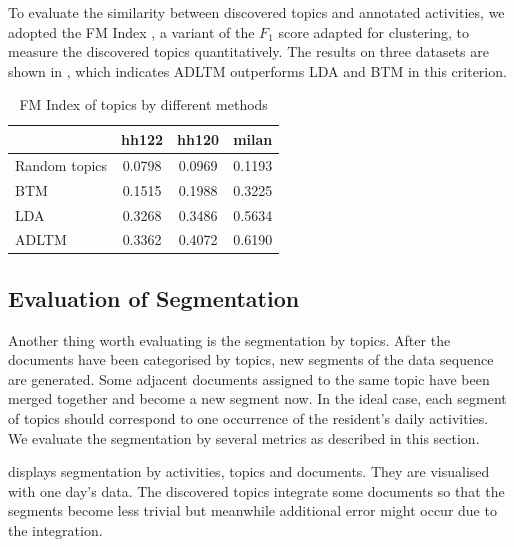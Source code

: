 \documentclass{article}
\begin{document}
To evaluate the similarity between discovered topics and annotated activities, we adopted the \ac{FM} Index \cite{fowlkes1983method,Ramirez2012125}, a variant of the $F_1$ score adapted for clustering, to measure the discovered topics quantitatively. The results on three datasets are shown in , which indicates \ac{ADLTM} outperforms \ac{LDA} \cite{blei2003latent} and \ac{BTM} \cite{wallach2006topic} in this criterion.

{%
\begin{table}[!t]
\centering
\scriptsize
\begin{tabular}{lccc}
\toprule
              & hh122  & hh120  & milan \\
\midrule
Random topics & 0.0798 & 0.0969 & 0.1193 \\
\ac{BTM}      & 0.1515 & 0.1988 & 0.3225 \\
\ac{LDA}      & 0.3268 & 0.3486 & 0.5634 \\
\ac{ADLTM}    & 0.3362 & 0.4072 & 0.6190 \\
\bottomrule
\end{tabular}
\caption{\ac{FM} Index of topics by different methods}
\label{tab:fmidx}
\end{table}
}


\subsection{Evaluation of Segmentation}
Another thing worth evaluating is the segmentation by topics. After the documents have been categorised by topics, new segments of the data sequence are generated. Some adjacent documents assigned to the same topic have been merged together and become a new segment now.  In the ideal case, each segment of topics should correspond to one occurrence of the resident's daily activities. We evaluate the segmentation by several metrics as described in this section.

 displays segmentation by activities, topics and documents. They are visualised with one day's data. The discovered topics integrate some documents so that the segments become less trivial but meanwhile additional error might occur due to the integration. 
\end{document}
